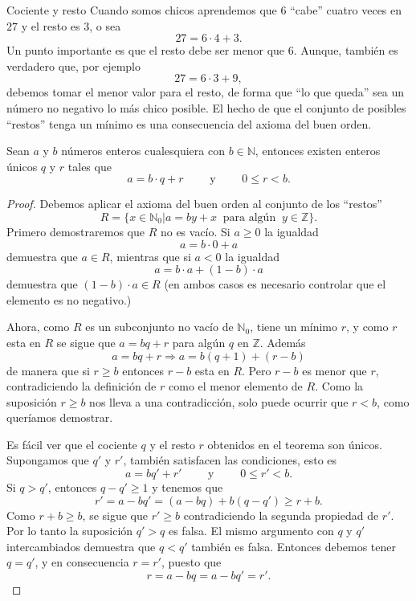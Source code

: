 \begin{section}{Cociente y resto}\label{1.5}
Cuando somos chicos aprendemos que $6$ ``cabe'' cuatro veces en $27$ y
el resto es $3$, o sea
$$
27=6 \cdot 4 + 3.
$$
Un punto importante es que el resto debe ser menor que 6. Aunque,
también es verdadero que, por ejemplo
$$
27=6 \cdot 3 + 9,
$$
debemos tomar el menor valor para el resto, de forma que ``lo que
queda'' sea un número no negativo lo más chico posible. El hecho de que el conjunto de
posibles ``restos'' tenga un mínimo es una consecuencia del axioma
del buen orden.

\begin{teorema}\label{t1.5} Sean $a$ y $b$ números enteros
cualesquiera con $b \in \mathbb N$, entonces existen enteros únicos $q$ y
$r$ tales que
$$
a=b \cdot q + r\qquad\text{ y }\qquad 0\le r<b.
$$
\end{teorema}
\begin{proof} Debemos aplicar el axioma del buen orden al
conjunto de los ``restos''
$$ R=\{x \in \mathbb N_0 | a = by + x \ \text{ para algún }\ y \in \mathbb Z\}.
$$
Primero demostraremos que $R$ no es vacío. Si $a\ge 0$ la igualdad
$$
a= b\cdot 0 + a
$$
demuestra que $a \in R$, mientras que si $a<0$ la igualdad
$$
a= b\cdot a + (1-b)\cdot a
$$
demuestra que $(1-b)\cdot a\in R$ (en ambos casos es necesario controlar
que el
 elemento es no negativo.)


Ahora, como $R$ es un subconjunto no vacío de $\mathbb N_0$, tiene
un mínimo $r$, y como $r$ esta en $R$ se sigue que $a=bq+r$ para
algún $q$ en $\mathbb Z$. Además
$$
a=bq+r \Rightarrow a=b(q+1)+(r-b)
$$
de manera que si $r\ge b$ entonces $r-b$ esta en $R$. Pero $r-b$
es menor que $r$, contradiciendo la definición de $r$ como el
menor elemento de $R$. Como la suposición $r \ge b$ nos lleva a
una contradicción, solo puede ocurrir que $ r<b$, como queríamos
demostrar.


Es fácil ver que el cociente $q$ y el resto $r$ obtenidos en el
teorema son únicos. Supongamos que $q'$ y $ r'$, también
satisfacen las condiciones, esto es
$$
a=bq'+r' \qquad \text{ y } \qquad 0\le r' < b.
$$
Si $q>q'$, entonces $q-q' \ge 1$ y tenemos que
$$
r'=a-bq' = (a-bq)+b(q-q') \ge r+b.
$$
Como $r+b \ge b$, se sigue que $r'\ge b$ contradiciendo la segunda propiedad de $r'$. Por lo tanto la suposición $q'>q$ es falsa. El
mismo argumento con $q$ y $q'$ intercambiados demuestra que $q<q'$
también es falsa. Entonces debemos tener $q=q'$, y en consecuencia
$ r=r'$, puesto que
$$
r=a-bq = a-bq'=r'.
$$
\end{proof}



\end{section}
